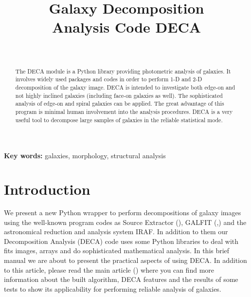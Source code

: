 \documentclass[
aps,%
12pt,%
final,%
notitlepage,%
oneside,%
onecolumn,%
nobibnotes,%
nofootinbib,%
superscriptaddress,%
noshowpacs,%
centertags]%
{revtex4}
\begin{document}

\title{Galaxy Decomposition \\ Analysis Code DECA}%

\author{~}
%
%


\begin{abstract}
The DECA module is a Python library providing photometric analysis of galaxies. It involves widely used packages and codes in order to perform 1-D and 2-D decomposition of the galaxy image. DECA is intended to investigate both edge-on and not highly inclined galaxies (including face-on galaxies as well). The sophisticated analysis of edge-on and spiral galaxies can be applied. The great advantage of this program is minimal human involvement into the analysis procedures. DECA is a very useful tool to decompose large samples of galaxies in the reliable statistical mode.
\end{abstract}

\maketitle


\noindent
{\bf Key words:\/} galaxies, morphology, structural analysis

\section{Introduction}

We present a new Python wrapper to perform decompositions of galaxy images using the well-known program codes as Source Extractor (\cite{Bertin}), GALFIT (\cite{Peng02},\cite{Peng10}) and the astronomical reduction and analysis system IRAF. In addition to them our Decomposition Analysis (DECA) code uses some Python libraries to deal with fits images, arrays and do sophisticated mathematical analysis. In this brief manual we are about to present the practical aspects of using DECA. In addition to this article, please read the main article (\cite{Mosenkov}) where you can find more information about the built algorithm, DECA features and the results of some tests to show its applicability for performing reliable analysis of galaxies.  
 
\end{document}
